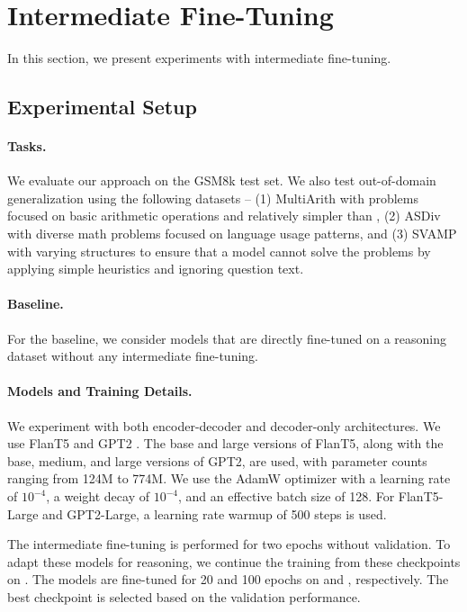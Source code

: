 \section{Intermediate Fine-Tuning}
In this section, we present experiments with intermediate fine-tuning.

\subsection{Experimental Setup}
\paragraph{Tasks.}
We evaluate our approach on the GSM8k test set. We also test out-of-domain generalization using the following datasets -- (1) MultiArith \citep{roy-roth-2015-solving} with problems focused on basic arithmetic operations and relatively simpler than \gsm{}, (2) ASDiv \citep{miao-etal-2020-diverse} with diverse math problems focused on language usage patterns, and (3) SVAMP \citep{patel-etal-2021-nlp} with varying structures to ensure that a model cannot solve the problems by applying simple heuristics and ignoring question text.

\paragraph{Baseline.}
For the baseline, we consider models that are directly fine-tuned on a reasoning dataset without any intermediate fine-tuning.

\paragraph{Models and Training Details.}
We experiment with both encoder-decoder and decoder-only architectures. We use FlanT5 \citep{chung2024scaling} and GPT2 \citep{radford2019language}. The base and large versions of FlanT5, along with the base, medium, and large versions of GPT2, are used, with parameter counts ranging from 124M to 774M. We use the AdamW optimizer \citep{loshchilov2017decoupled} with a learning rate of $10^{-4}$, a weight decay of $10^{-4}$, and an effective batch size of 128. For FlanT5-Large and GPT2-Large, a learning rate warmup of 500 steps is used.

The intermediate fine-tuning is performed for two epochs without validation. To adapt these models for reasoning, we continue the training from these checkpoints on \gsm{}. The models are fine-tuned for 20 and 100 epochs on \gsmd{} and \gsmo{}, respectively. The best checkpoint is selected based on the \gsm{} validation performance.


